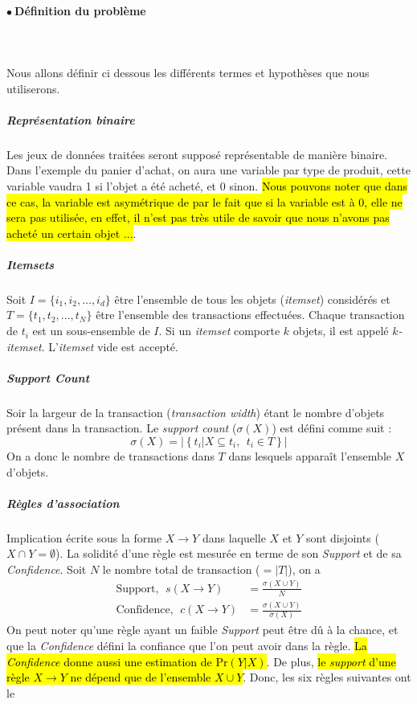 \documentclass[letterpaper, 12pt]{article}
\newcommand{\alinea}{
\hspace*{0.5cm}}
\newcommand{\point}{$\bullet\ $}
\begin{document}
	\paragraph{\point Définition du problème}~\\~\\
		\alinea Nous allons définir ci dessous les différents
			termes et hypothèses que nous utiliserons.
		\subparagraph{Représentation binaire} Les jeux de données
			traitées seront supposé représentable de manière binaire.
			Dans l'exemple du panier d'achat, on aura une variable par
			type de produit, cette variable vaudra 1 si l'objet a été acheté,
			et 0 sinon. \hl{Nous pouvons noter que dans ce cas, la variable
			est asymétrique de par le fait que si la variable est à 0,
			elle ne sera pas utilisée, en effet, il n'est pas très utile 
			de savoir que nous n'avons pas acheté un certain objet ...}.
		\subparagraph{\textit{Itemsets}} Soit
			$I = \{i_1, i_2, \ldots, i_d\}$ être l'ensemble de tous 
			les objets (\textit{itemset}) considérés et 
			$T = \{t_1, t_2, \ldots, t_N\}$ être l'ensemble des transactions
			effectuées. Chaque transaction de $t_i$ est un sous-ensemble
			de $I$. Si un \textit{itemset} comporte $k$ objets, il est 
			appelé \textit{$k$-itemset}. L'\textit{itemset} vide est accepté.
		\subparagraph{\textit{Support Count}} Soir la largeur de la 
			transaction (\textit{transaction width}) étant le nombre
			d'objets présent dans la transaction. Le \textit{support count}
			($\sigma(X)$) est défini comme suit : 
			$$ \sigma(X) = |\left\lbrace t_i | X \subseteq t_i,\ \ t_i \in T
				\right\rbrace| $$
			On a donc le nombre de transactions dans $T$ dans lesquels
			apparaît l'ensemble $X$ d'objets.
		\subparagraph{Règles d'association} Implication écrite sous la forme
			$X \longrightarrow Y$ dans laquelle $X$ et $Y$ sont disjoints
			($X \cap Y = \emptyset$). La solidité d'une règle est
			mesurée en terme de son \textit{Support} et de sa
			\textit{Confidence}. Soit $N$ le nombre total de transaction
			($ = |T|$), on a 
			\begin{align*}
				\text{Support},\ \ s(X \longrightarrow Y) &= 
							\frac{\sigma(X \cup Y)}{N}\\
				\text{Confidence},\ \ c(X \longrightarrow Y) &= 
							\frac{\sigma(X \cup Y)}{\sigma(X)}
			\end{align*}
			On peut noter qu'une règle ayant un faible \textit{Support}
				peut être dû à la chance, et que la \textit{Confidence}
				défini la confiance que l'on peut avoir dans la règle.
			\hl{La \textit{Confidence} donne aussi une estimation
			de $\text{Pr}(Y | X)$}. De plus, \hl{le \textit{support} d'une
			règle $X \longrightarrow Y$ ne dépend que de l'ensemble
			$X \cup Y$}. Donc, les six règles suivantes ont le
\end{document}

